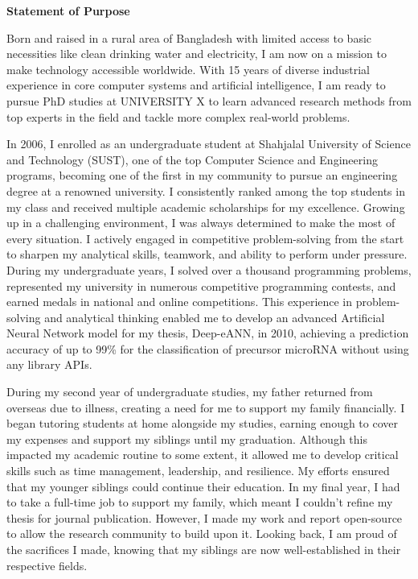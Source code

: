 \documentclass[11pt]{article}
\newif\ifshowsections
\newcommand{\tabsection}[1]{\par\noindent\textbf{#1}\par\indent}
\begin{document}
\begin{center}
    {\Large \textbf{Statement of Purpose}}
\end{center}


Born and raised in a rural area of Bangladesh with limited access to basic necessities like clean drinking water and electricity, I am now on a mission to make technology accessible worldwide. With 15 years of diverse industrial experience in core computer systems and artificial intelligence, I am ready to pursue PhD studies at UNIVERSITY X to learn advanced research methods from top experts in the field and tackle more complex real-world problems.

In 2006, I enrolled as an undergraduate student at Shahjalal University of Science and Technology (SUST), one of the top Computer Science and Engineering programs, becoming one of the first in my community to pursue an engineering degree at a renowned university. I consistently ranked among the top students in my class and received multiple academic scholarships for my excellence. Growing up in a challenging environment, I was always determined to make the most of every situation. I actively engaged in competitive problem-solving from the start to sharpen my analytical skills, teamwork, and ability to perform under pressure. During my undergraduate years, I solved over a thousand programming problems, represented my university in numerous competitive programming contests, and earned medals in national and online competitions. This experience in problem-solving and analytical thinking enabled me to develop an advanced Artificial Neural Network model for my thesis, Deep-eANN, in 2010, achieving a prediction accuracy of up to 99\% for the classification of precursor microRNA without using any library APIs.

During my second year of undergraduate studies, my father returned from overseas due to illness, creating a need for me to support my family financially. I began tutoring students at home alongside my studies, earning enough to cover my expenses and support my siblings until my graduation. Although this impacted my academic routine to some extent, it allowed me to develop critical skills such as time management, leadership, and resilience. My efforts ensured that my younger siblings could continue their education. In my final year, I had to take a full-time job to support my family, which meant I couldn't refine my thesis for journal publication. However, I made my work and report open-source to allow the research community to build upon it. Looking back, I am proud of the sacrifices I made, knowing that my siblings are now well-established in their respective fields.
\end{document}

